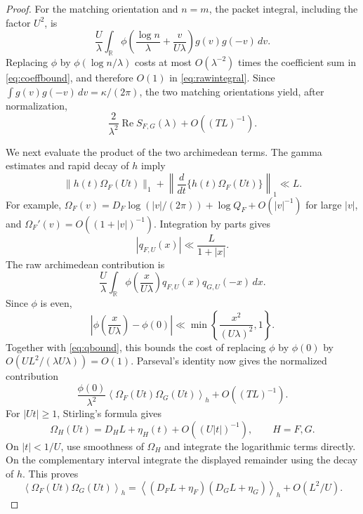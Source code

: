 \documentclass[11pt]{article}
\numberwithin{equation}{section}
\theoremstyle{remark}
\newcommand{\R}{\mathbb R}
\newcommand{\Rea}{\operatorname{Re}}
\newcommand{\av}[1]{\left\langle #1\right\rangle_h}
\begin{document}
\begin{proof}
For the matching orientation and $n=m$, the packet integral, including
the factor $U^2$, is
\[
 \frac U\lambda\int_\R
 \phi\!\left(\frac{\log n}{\lambda}+\frac v{U\lambda}\right)
                          g(v)g(-v)\,dv.
\]
Replacing $\phi$ by $\phi(\log n/\lambda)$ costs at most
$O(\lambda^{-2})$ times the coefficient sum in
\eqref{eq:coeffbound}, and therefore $O(1)$ in
\eqref{eq:rawintegral}. Since $\int g(v)g(-v)\,dv=\kappa/(2\pi)$,
the two matching orientations yield, after normalization,
\begin{equation}\label{eq:arithmeticpart}
 \frac2{\lambda^2}\Rea S_{F,G}(\lambda)+O((TL)^{-1}).
\end{equation}

We next evaluate the product of the two archimedean terms. The gamma
estimates and rapid decay of $h$ imply
\[
 \|h(t)\Omega_F(Ut)\|_1+
 \left\|\frac d{dt}\{h(t)\Omega_F(Ut)\}\right\|_1\ll L.
\]
For example, $\Omega_F(v)=D_F\log(|v|/(2\pi))+\log Q_F+O(|v|^{-1})$
for large $|v|$, and $\Omega_F'(v)=O((1+|v|)^{-1})$.
Integration by parts gives
\begin{equation}\label{eq:qbound}
 |q_{F,U}(x)|\ll\frac{L}{1+|x|}.
\end{equation}
The raw archimedean contribution is
\[
 \frac U\lambda\int_\R
       \phi\!\left(\frac{x}{U\lambda}\right)
                    q_{F,U}(x)q_{G,U}(-x)\,dx.
\]
Since $\phi$ is even,
\[
 \left|\phi\!\left(\frac{x}{U\lambda}\right)-\phi(0)\right|
 \ll\min\left\{\frac{x^2}{(U\lambda)^2},1\right\}.
\]
Together with \eqref{eq:qbound}, this bounds the cost of replacing
$\phi$ by $\phi(0)$ by $O(UL^2/(\lambda U\lambda))=O(1)$.
Parseval's identity now gives the normalized contribution
\begin{equation}\label{eq:exactdensity}
 \frac{\phi(0)}{\lambda^2}\av{\Omega_F(Ut)\Omega_G(Ut)}
       +O((TL)^{-1}).
\end{equation}
For $|Ut|\geq1$, Stirling's formula gives
\[
 \Omega_H(Ut)=D_HL+\eta_H(t)+O((U|t|)^{-1}),\qquad H=F,G.
\]
On $|t|<1/U$, use smoothness of $\Omega_H$ and integrate the
logarithmic terms directly. On the complementary interval integrate
the displayed remainder using the decay of $h$. This proves
\begin{equation}\label{eq:densityapprox}
 \av{\Omega_F(Ut)\Omega_G(Ut)}
 =\av{(D_FL+\eta_F)(D_GL+\eta_G)}+O(L^2/U).
\end{equation}


\end{proof}
\end{document}
